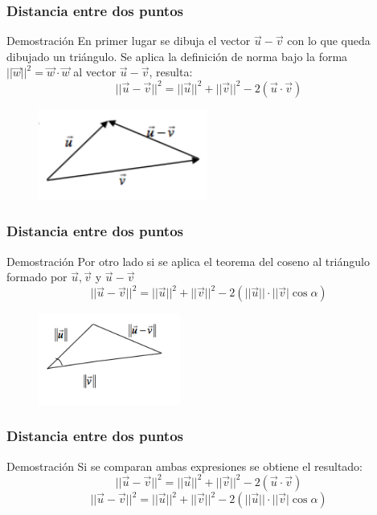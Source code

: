 \documentclass{beamer}
\begin{document}
\begin{frame}
  \frametitle{Distancia entre dos puntos}
    \begin{block}{Demostraci\'on}
En primer lugar se dibuja el vector $\vec u -\vec v$ con lo que queda dibujado un tri\'angulo. Se aplica la definici\'on de norma bajo la forma $||\vec w||^2 = \vec w \cdot \vec w$ al vector $\vec u -\vec v$, resulta:
\[||\vec u - \vec v||^2 = ||\vec u||^2+||\vec v||^2-2(\vec u\cdot \vec v)\]
 \end{block}

\begin{figure}[h]
    \label{fig:teorema del coseno}
\centering
\includegraphics[height=3cm]{th_1}
\end{figure}
\end{frame}



\begin{frame}
  \frametitle{Distancia entre dos puntos}
    \begin{block}{Demostraci\'on}
Por otro lado si se aplica el teorema del coseno al tri\'angulo formado por $\vec u, \vec v $ y $\vec u-\vec v$
\[||\vec u - \vec v||^2 = ||\vec u||^2+||\vec v||^2-2(||\vec u||\cdot ||\vec v|\cos \alpha)\]
 \end{block}

\begin{figure}[h]
    \label{fig:teorema del coseno}
\centering
\includegraphics[height=3cm]{th_2}
\end{figure}
\end{frame}

\begin{frame}
  \frametitle{Distancia entre dos puntos}
    \begin{block}{Demostraci\'on}
Si se comparan ambas expresiones se obtiene el resultado:
\[||\vec u - \vec v||^2 = ||\vec u||^2+||\vec v||^2-2(\vec u\cdot \vec v)\]
\[||\vec u - \vec v||^2 = ||\vec u||^2+||\vec v||^2-2(||\vec u||\cdot ||\vec v|\cos \alpha)\]
 \end{block}

\end{frame}
\end{document}
